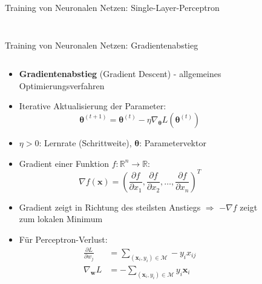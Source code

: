 \documentclass[aspectratio=1610, xcolor=dvipsnames, 9pt]{beamer}
\begin{document}
\begin{frame}{Training von Neuronalen Netzen: Single-Layer-Perceptron}
\begin{columns}
\begin{column}{0.3\textwidth}
\begin{figure}
       \end{figure}
          \end{column}
        \end{columns}
      \end{frame}

      \begin{frame}{Training von Neuronalen Netzen: Gradientenabstieg}
        \begin{columns}
          \begin{column}{0.7\textwidth}
            \begin{itemize}
              \item \textbf{Gradientenabstieg} (Gradient Descent) - allgemeines Optimierungsverfahren
              \item Iterative Aktualisierung der Parameter:
                    \begin{equation}
                       \boldsymbol{\theta}^{(t+1)} = \boldsymbol{\theta}^{(t)} - \eta \nabla_{\boldsymbol{\theta}} L(\boldsymbol{\theta}^{(t)})
                    \end{equation}
              \item $\eta > 0$: Lernrate (Schrittweite), $\boldsymbol{\theta}$: Parametervektor
              \item Gradient einer Funktion $f: \mathbb{R}^n \to \mathbb{R}$:
              \begin{equation}
                \nabla f(\mathbf{x}) = \left( \frac{\partial f}{\partial x_1}, \frac{\partial f}{\partial x_2}, \ldots, \frac{\partial f}{\partial x_n} \right)^T
              \end{equation}
              \item Gradient zeigt in Richtung des steilsten Anstiegs $\Rightarrow$ $-\nabla f$ zeigt zum lokalen Minimum
              \item Für Perceptron-Verlust: 
              \begin{align}
                \frac{\partial L}{\partial w_j} &= \sum_{(\mathbf{x}_i, y_i) \in \mathcal{M}} -y_i x_{ij} \\
                \nabla_{\mathbf{w}} L &= -\sum_{(\mathbf{x}_i, y_i) \in \mathcal{M}} y_i \mathbf{x}_i
              \end{align}
            \end{itemize}
          \end{column}
          \begin{column}{0.3\textwidth}
       \begin{figure}

\end{figure}
\end{column}
\end{columns}
\end{frame}
\end{document}
